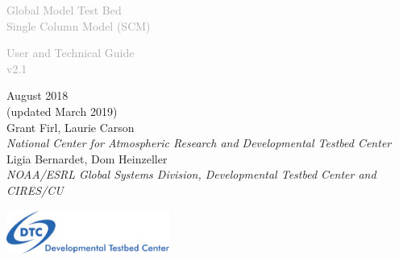 \begin{titlepage}
\renewcommand{\thefootnote}{\fnsymbol{footnote}}

\vspace*{1em}
\noindent

\begin{center}
\textcolor{darkgray}{\bigsf Global Model Test Bed\\[0.5ex] Single Column Model (SCM)}
\vspace*{1em}\par

\textcolor{darkgray}{\bigst User and Technical Guide\\[0.5ex] v2.1}
\vspace*{1em}\par

\large{August 2018}\\
\large{(updated March 2019)}\\[4em]

Grant Firl, Laurie Carson\\
\textit{\small{National Center for Atmospheric Research and Developmental Testbed Center}}\\[4em]

Ligia Bernardet, Dom Heinzeller\\
\textit{\small{NOAA/ESRL Global Systems Division, Developmental Testbed Center and CIRES/CU}}\\[4em]

\vspace{4em}

\includegraphics[width=0.4\textwidth]{images/dtc_logo.png}\\[2em]

\end{center}
\end{titlepage}
\pagebreak{}
